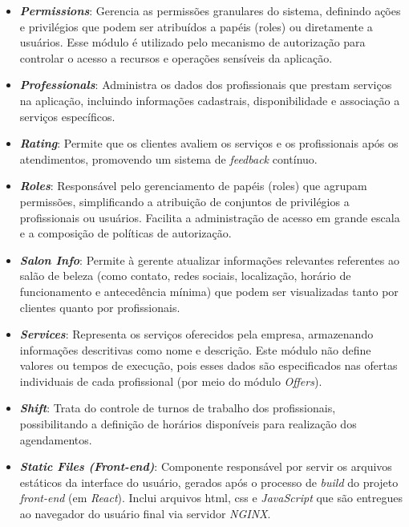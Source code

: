\begin{itemize}
  \item \textbf{\emph{Permissions}}: Gerencia as permissões granulares do sistema, definindo ações e privilégios que podem ser atribuídos a papéis (roles) ou diretamente a usuários. Esse módulo é utilizado pelo mecanismo de autorização para controlar o acesso a recursos e operações sensíveis da aplicação.

  \item \textbf{\emph{Professionals}}: Administra os dados dos profissionais que prestam serviços na aplicação, incluindo informações cadastrais, disponibilidade e associação a serviços específicos.
  
  \item \textbf{\emph{Rating}}: Permite que os clientes avaliem os serviços e os profissionais após os atendimentos, promovendo um sistema de \emph{feedback} contínuo.

  \item \textbf{\emph{Roles}}: Responsável pelo gerenciamento de papéis (roles) que agrupam permissões, simplificando a atribuição de conjuntos de privilégios a profissionais ou usuários. Facilita a administração de acesso em grande escala e a composição de políticas de autorização.
  
  \item \textbf{\emph{Salon Info}}: Permite à gerente atualizar informações relevantes referentes ao salão de beleza (como contato, redes sociais, localização, horário de funcionamento e antecedência mínima) que podem ser visualizadas tanto por clientes quanto por profissionais.

  \item \textbf{\emph{Services}}: Representa os serviços oferecidos pela empresa, armazenando informações descritivas como nome e descrição. Este módulo não define valores ou tempos de execução, pois esses dados são especificados nas ofertas individuais de cada profissional (por meio do módulo \textit{Offers}).

  \item \textbf{\emph{Shift}}: Trata do controle de turnos de trabalho dos profissionais, possibilitando a definição de horários disponíveis para realização dos agendamentos.
  
  \item \textbf{\emph{Static Files (Front-end)}}: Componente responsável por servir os arquivos estáticos da interface do usuário, gerados após o processo de \textit{build} do projeto \emph{front-end} (em \emph{React}). Inclui arquivos \gls{html}, \gls{css} e \emph{JavaScript} que são entregues ao navegador do usuário final via servidor \emph{NGINX}.
\end{itemize}

